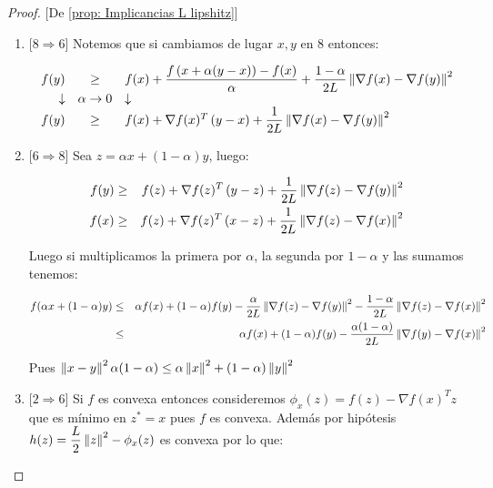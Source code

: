 \begin{proof}{[De \ref{prop: Implicancias L lipshitz}]}
\begin{enumerate}
		\item {[$8 \Longrightarrow 6$]} Notemos que si cambiamos de lugar $x,y$ en $8$ entonces:
		
		
		\begin{equation*}
		\begin{array}{rcl}
			f(y) & \geq & f(x) + \dfrac{f\left(x + \alpha (y-x)\right) -f(x)}{\alpha} + \dfrac{1-\alpha}{2L}\left\lVert\nabla f(x) - \nabla f(y)\right\rVert^2 \\
			\downarrow & \alpha \rightarrow 0 & \downarrow \\
			f(y) & \geq & f(x) + \nabla f(x)^T \left(y-x\right) +  \dfrac{1}{2L}\left\lVert\nabla f(x) - \nabla f(y)\right\rVert^2 
		\end{array}
		\end{equation*} 
		
		\item {[$6 \Longrightarrow 8$]} Sea $z = \alpha x + (1-\alpha)y$, luego:
		
		\begin{equation*}
		\begin{aligned}
		f(y) & \geq & f(z) + \nabla f(z)^T \left(y-z\right) +  \dfrac{1}{2L}\left\lVert\nabla f(z) - \nabla f(y)\right\rVert^2  \\
		f(x) & \geq & f(z) + \nabla f(z)^T \left(x-z\right) +  \dfrac{1}{2L}\left\lVert\nabla f(z) - \nabla f(x)\right\rVert^2 
		\end{aligned}
		\end{equation*}
		
		Luego si multiplicamos la primera por $\alpha$, la segunda por $1-\alpha$ y las sumamos tenemos:
		
		\begin{equation*}
			\begin{aligned}
				f(\alpha x + (1-\alpha)y) & \leq & \alpha f(x) + (1-\alpha)f(y) - \dfrac{\alpha}{2L}\left\lVert\nabla f(z) - \nabla f(y)\right\rVert^2 - \dfrac{1-\alpha}{2L}\left\lVert\nabla f(z) - \nabla f(x)\right\rVert^2 \\
				& \leq & \alpha f(x) + (1-\alpha)f(y) - \dfrac{\alpha (1-\alpha)}{2L}\left\lVert\nabla f(y) - \nabla f(x)\right\rVert^2
			\end{aligned}
		\end{equation*}
		
		Pues $\left\lVert x-y\right\rVert^2\alpha (1-\alpha) \leq \alpha \left\lVert x\right\rVert^2 + (1-\alpha)\left\lVert y\right\rVert^2$
		
			\item {[$2 \Longrightarrow 6$]} Si $f$ es convexa entonces consideremos $\phi_x(z) = f(z) - \nabla f(x)^T z$ que es m\'inimo en $z^* = x$ pues $f$ es convexa. Adem\'as por hip\'otesis $h(z) = \dfrac{L}{2} \left\lVert z\right\rVert^2 - \phi_x(z)$ es convexa por lo que:
		

\end{enumerate}
\end{proof}
